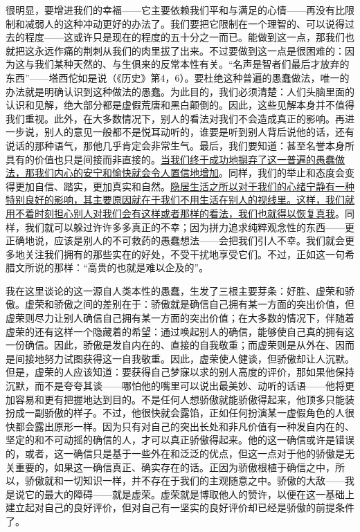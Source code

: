 \documentclass[12pt,oneside]{book}
\begin{document}
很明显，要增进我们的幸福——它主要依赖我们平和与满足的心情——再没有比限制和减弱人的这种冲动更好的办法了。我们要把它限制在一个理智的、可以说得过去的程度——这或许只是现在的程度的五十分之一而已。能做到这一点，那我们也就把这永远作痛的荆刺从我们的肉里拔了出来。不过要做到这一点是很困难的：因为这与我们某种天然的、与生俱来的反常本性有关。“名声是智者们最后才放弃的东西”——塔西佗如是说（《历史》第4，6）。要杜绝这种普遍的愚蠢做法，唯一的办法就是明确认识到这种做法的愚蠢。为此目的，我们必须清楚：人们头脑里面的认识和见解，绝大部分都是虚假荒唐和黑白颠倒的。因此，这些见解本身并不值得我们重视。此外，在大多数情况下，别人的看法对我们不会造成真正的影响。再进一步说，别人的意见一般都不是悦耳动听的，谁要是听到别人背后说他的话，还有说话的那种语气，那他几乎肯定会非常生气。最后，我们要知道：甚至名誉本身所具有的价值也只是间接而非直接的。\uline{当我们终于成功地摒弃了这一普遍的愚蠢做法，那我们内心的安宁和愉快就会令人置信地增加}。同样，我们的举止和态度会变得更加自信、踏实，更加真实和自然。\uline{隐居生活之所以对于我们的心绪宁静有一种特别良好的影响，其主要原因就在于我们不用生活在别人的视线里。这样，我们就用不着时刻担心别人对我们会有这样或者那样的看法，我们也就得以恢复真我}。同样，我们就可以躲过许许多多真正的不幸；因为拼力追求纯粹观念性的东西——更正确地说，应该是别人的不可救药的愚蠢想法——会把我们引人不幸。我们就会更多地关注我们拥有的那些实在的好处，不受干扰地享受它们。不过，正如这一句希腊文所说的那样：“高贵的也就是难以企及的”。 

我在这里谈论的这一源自人类本性的愚蠢，生发了三根主要芽条：好胜、虚荣和骄傲。虚荣和骄傲之间的差别在于：骄傲就是确信自己拥有某一方面的突出价值，但虚荣则尽力让别人确信自己拥有某一方面的突出价值；在大多数的情况下，伴随着虚荣的还有这样一个隐藏着的希望：通过唤起别人的确信，能够使自己真的拥有这一份确信。因此，骄傲是发自内在的、直接的自我敬重；而虚荣则是从外在、因而是间接地努力试图获得这一自我敬重。因此，虚荣使人健谈，但骄傲却让人沉默。但是，虚荣的人应该知道：要获得自己梦寐以求的别人高度的评价，那如果他保持沉默，而不是夸夸其谈——哪怕他的嘴里可以说出最美妙、动听的话语——他将更加容易和更有把握地达到目的。不是任何人想骄傲就能骄傲得起来，他顶多只能装扮成一副骄傲的样子。不过，他很快就会露馅，正如任何扮演某一虚假角色的人很快都会露出原形一样。因为只有对自己的突出长处和非凡价值有一种发自内在的、坚定的和不可动摇的确信的人，才可以真正骄傲得起来。他的这一确信或许是错误的，或者，这一确信只是基于一些外在和泛泛的优点，但这一点对于他的骄傲是无关重要的，如果这一确信真正、确实存在的话。正因为骄傲根植于确信之中，所以，骄傲就和一切知识一样，并不存在于我们的主观随意之中。骄傲的大敌——我是说它的最大的障碍——就是虚荣。虚荣就是博取他人的赞许，以便在这一基础上建立起对自己的良好评价，但对自己有一坚实的良好评价却已经是骄傲的前提条件了。 
\end{document}
